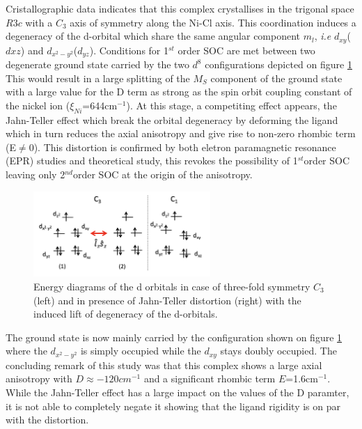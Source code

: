 \documentclass[10pt]{report}
\numberwithin{equation}{section}
\begin{document}
Cristallographic data indicates that this complex crystallises in the trigonal space $R3c$ with a $C_3$ axis of symmetry along the Ni-Cl axis.
This coordination induces a degeneracy of the d-orbital which share the same angular component $m_l$, \textit{i.e} $d_{xy}$($d{xz}$) and $d_{x^2-y^2}$($d_{yz}$). 
Conditions for 1$^{st}$ order SOC are met between two degenerate ground state carried by the two $d^8$ configurations depicted on figure \ref{NiMe6tren_config}
This would result in a large splitting of the $M_S$ component of the ground state with a large value for the D term as strong as the spin orbit coupling constant of the nickel ion ($\xi_{Ni}$=644cm$^{-1}$).
At this stage, a competiting effect appears, the Jahn-Teller effect which break the orbital degeneracy by deforming the ligand which in turn reduces the axial anisotropy and give rise to non-zero rhombic term (E$\neq$0).
This distortion is confirmed by both eletron paramagnetic resonance (EPR) studies and theoretical study, this revokes the possibility of 1$^{st}$order SOC leaving only 2$^{nd}$order SOC at the origin of the anisotropy.

\begin{figure}
    \centering
    \includegraphics[width=0.6\textwidth]{Images/NiMe6tren_config.png}
    \caption{Energy diagrams of the d orbitals in case of three-fold symmetry $C_3$ (left) and in presence of Jahn-Teller distortion (right) with the induced lift of degeneracy of the d-orbitals. }
    \label{NiMe6tren_config}
\end{figure}

The ground state is now mainly carried by the configuration shown on figure \ref{NiMe6tren_config} where the $d_{x^2-y^2}$ is simply occupied while the $d_{xy}$ stays doubly occupied.
The concluding remark of this study was that this complex shows a large axial anisotropy with $D\approx-120cm^{-1}$ and a significant rhombic term $E$=1.6cm$^{-1}$. 
While the Jahn-Teller effect has a large impact on the values of the D paramter, it is not able to completely negate it showing that the ligand rigidity is on par with the distortion.
\end{document}
